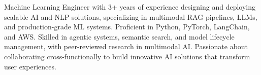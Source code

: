 \documentclass[letterpaper,11pt]{article}
\begin{document}
{{Machine Learning Engineer with 3+ years of experience designing and deploying scalable AI and NLP solutions, specializing in multimodal RAG pipelines, LLMs, and production-grade ML systems. Proficient in Python, PyTorch, LangChain, and AWS. Skilled in agentic systems, semantic search, and model lifecycle management, with peer-reviewed research in multimodal AI. Passionate about collaborating cross-functionally to build innovative AI solutions that transform user experiences.







}}




\end{document}
